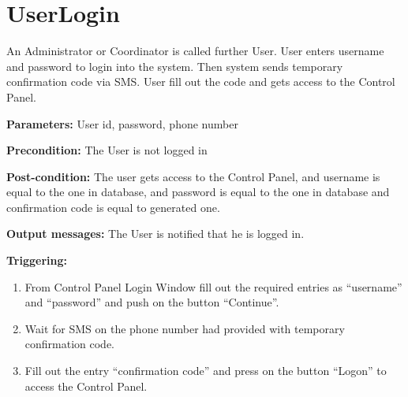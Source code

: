 \section{UserLogin}
\label{operation:UserLogin}
An Administrator or Coordinator is called further User. User enters username and
password to login into the system. Then system sends temporary confirmation code
via SMS. User fill out the code and gets access to the Control Panel.

\begin{description}

\item \textbf{Parameters:} User id, password, phone number
\item \textbf{Precondition:} The User is not logged in
\item \textbf{Post-condition:} The user gets access to the Control Panel, and
username is equal to the one in database, and password is equal to the one in
database and confirmation code is equal to generated one.
\item \textbf{Output messages:} The User is notified that he is logged in.

\item \textbf{Triggering:}
\begin{enumerate}
\item From Control Panel Login Window fill out the required entries as
``username'' and ``password'' and push on the button ``Continue''.
\item Wait for SMS on the phone number had provided with temporary confirmation
code.
\item Fill out the entry ``confirmation code'' and press on the button ``Logon''
to access the Control Panel.
\end{enumerate}
 
\end{description}


